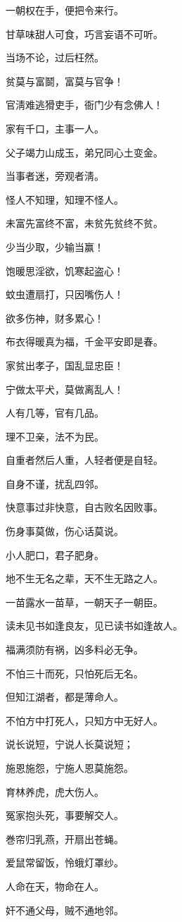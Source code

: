 \documentclass[12pt,oneside]{book}
\begin{document}
一朝权在手，便把令来行。

甘草味甜人可食，巧言妄语不可听。

当场不论，过后枉然。

贫莫与富鬬，富莫与官争！

官淸难逃猾吏手，衙门少有念佛人！

家有千口，主事一人。

父子竭力山成玉，弟兄同心土变金。

当事者迷，旁观者淸。

怪人不知理，知理不怪人。

未富先富终不富，未贫先贫终不贫。

少当少取，少输当赢！

饱暖思淫欲，饥寒起盗心！

蚊虫遭扇打，只因嘴伤人！

欲多伤神，财多累心！

布衣得暖真为福，千金平安即是春。

家贫出孝子，国乱显忠臣！

宁做太平犬，莫做离乱人！

人有几等，官有几品。

理不卫亲，法不为民。

自重者然后人重，人轻者便是自轻。

自身不谨，扰乱四邻。

快意事过非快意，自古败名因败事。

伤身事莫做，伤心话莫说。

小人肥口，君子肥身。

地不生无名之辈，天不生无路之人。

一苗露水一苗草，一朝天子一朝臣。

读未见书如逢良友，见已读书如逢故人。

福满须防有祸，凶多料必无争。

不怕三十而死，只怕死后无名。

但知江湖者，都是薄命人。

不怕方中打死人，只知方中无好人。

说长说短，宁说人长莫说短；

施恩施怨，宁施人恩莫施怨。

育林养虎，虎大伤人。

冤家抱头死，事要解交人。

巻帘归乳燕，开扇出苍蝇。

爱鼠常留饭，怜蛾灯罩纱。

人命在天，物命在人。

奸不通父母，贼不通地邻。
\end{document}
